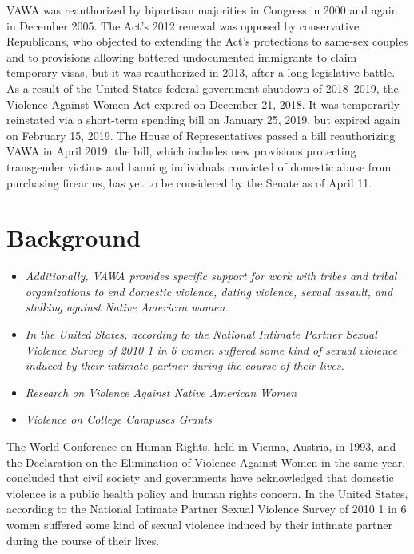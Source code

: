 VAWA was reauthorized by bipartisan majorities in Congress in 2000 and
again in December 2005. The Act's 2012 renewal was opposed by
conservative Republicans, who objected to extending the Act's
protections to same-sex couples and to provisions allowing battered
undocumented immigrants to claim temporary visas, but it was
reauthorized in 2013, after a long legislative battle. As a result of
the United States federal government shutdown of 2018--2019, the
Violence Against Women Act expired on December 21, 2018. It was
temporarily reinstated via a short-term spending bill on January 25,
2019, but expired again on February 15, 2019. The House of
Representatives passed a bill reauthorizing VAWA in April 2019; the
bill, which includes new provisions protecting transgender victims and
banning individuals convicted of domestic abuse from purchasing
firearms, has yet to be considered by the Senate as of April 11.

\section{Background}\label{background}

\begin{itemize}
\item
  \emph{Additionally, VAWA provides specific support for work with
  tribes and tribal organizations to end domestic violence, dating
  violence, sexual assault, and stalking against Native American women.}
\item
  \emph{In the United States, according to the National Intimate Partner
  Sexual Violence Survey of 2010 1 in 6 women suffered some kind of
  sexual violence induced by their intimate partner during the course of
  their lives.}
\item
  \emph{Research on Violence Against Native American Women}
\item
  \emph{Violence on College Campuses Grants}
\end{itemize}

The World Conference on Human Rights, held in Vienna, Austria, in 1993,
and the Declaration on the Elimination of Violence Against Women in the
same year, concluded that civil society and governments have
acknowledged that domestic violence is a public health policy and human
rights concern. In the United States, according to the National Intimate
Partner Sexual Violence Survey of 2010 1 in 6 women suffered some kind
of sexual violence induced by their intimate partner during the course
of their lives.

